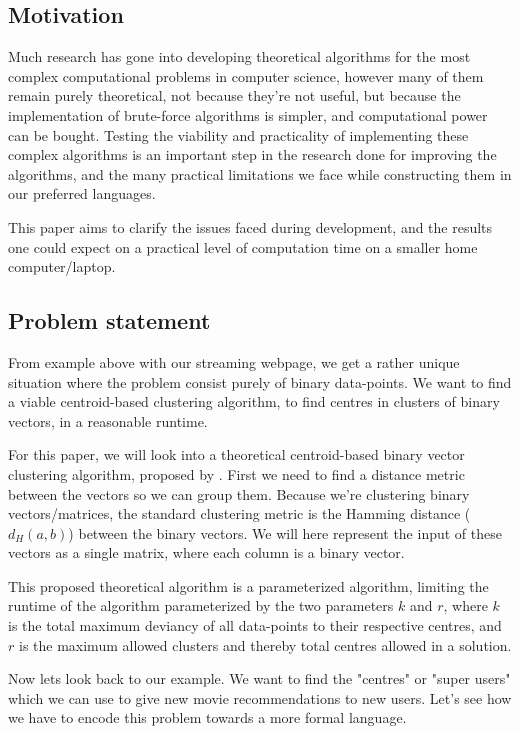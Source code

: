 \documentclass[a4paper]{article}
\begin{document}
\subsection{Motivation}
Much research has gone into developing theoretical algorithms for the most complex computational
problems in computer science, however many of them remain purely theoretical, not because
they're not useful, but because the implementation of brute-force algorithms is simpler, and
computational power can be bought. Testing the viability and practicality of implementing
these complex algorithms is an important step in the research done for improving the
algorithms, and the many practical limitations we face while constructing them in our
preferred languages.

This paper aims to clarify the issues faced during development, and the results one could expect
on a practical level of computation time on a smaller home computer/laptop.

\subsection{Problem statement}
From example above with our streaming webpage, we get a rather unique situation where the problem consist
purely of binary data-points. We want to find a viable centroid-based clustering algorithm, to find
centres in clusters of binary vectors, in a reasonable runtime.

For this paper, we will look into a theoretical centroid-based binary vector clustering algorithm, proposed
by \cite{fomin_golovach_panolan_2020}. First we need to find a distance metric between the vectors so we
can group them. Because we're clustering binary vectors/matrices, the standard clustering metric is
the Hamming distance (\textit{$d_H(a, b)$}) between the binary vectors. We will here represent the input of these
vectors as a single matrix, where each column is a binary vector.

This proposed theoretical algorithm is a parameterized algorithm, limiting the runtime of the
algorithm parameterized by the two parameters $k$ and $r$, where $k$ is the total maximum deviancy
of all data-points to their respective centres, and $r$ is the maximum allowed clusters and
thereby total centres allowed in a solution.

Now lets look back to our example. We want to find the "centres" or "super users" which we can use to
give new movie recommendations to new users. Let's see how we have to encode this problem towards
a more formal language.
\end{document}
